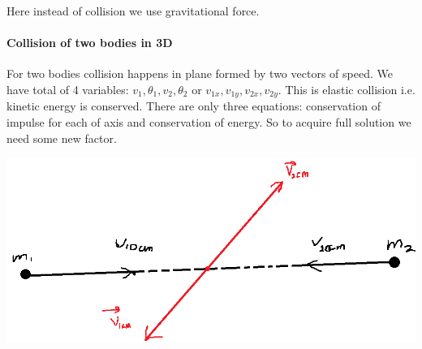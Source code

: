 \begin{center}	
	
\end{center}

Here instead of collision we use gravitational force.

\paragraph{Collision of two bodies in 3D}
For two bodies collision happens in plane formed by two vectors of speed. We have total of 4 variables: $v_1, \theta_1, v_2, \theta_2$ or $v_{1x}, v_{1y}, v_{2x}, v_{2y}$. This is elastic collision i.e. kinetic energy is conserved. There are only three equations: conservation of impulse for each of axis and conservation of energy. So to acquire full solution we need some new factor. 

\begin{center}
	\includegraphics[width=\linewidth]{./lect12/pic4.png}
\end{center}